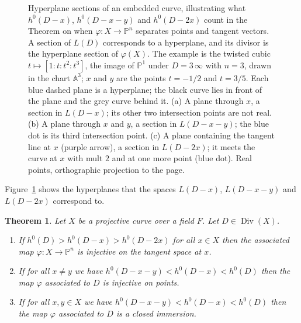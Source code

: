 \documentclass[12pt]{article}
\numberwithin{equation}{section}
\newtheorem{theorem}{Theorem}[subsection]
\theoremstyle{definition}
\theoremstyle{remark}
\newcommand{\PP}{\mathbb{P}}
\renewcommand{\AA}{\mathbb{A}}
\newcommand{\Div}{\operatorname{Div}}
\begin{document}
\begin{figure}[H]
\centering

\caption{Hyperplane sections of an embedded curve, illustrating what $h^0(D-x)$, $h^0(D-x-y)$ and $h^0(D-2x)$ count in the Theorem on when $\varphi\colon X\to\PP^n$ separates points and tangent vectors. A section of $L(D)$ corresponds to a hyperplane, and its divisor is the hyperplane section of $\varphi(X)$. The example is the twisted cubic $t\mapsto[1{:}t{:}t^2{:}t^3]$, the image of $\PP^1$ under $D=3\,\infty$ with $n=3$, drawn in the chart $\AA^3$; $x$ and $y$ are the points $t=-1/2$ and $t=3/5$. Each blue dashed plane is a hyperplane; the black curve lies in front of the plane and the grey curve behind it. (a) A plane through $x$, a section in $L(D-x)$; its other two intersection points are not real. (b) A plane through $x$ and $y$, a section in $L(D-x-y)$; the blue dot is its third intersection point. (c) A plane containing the tangent line at $x$ (purple arrow), a section in $L(D-2x)$; it meets the curve at $x$ with mult $2$ and at one more point (blue dot). Real points, orthographic projection to the page.}\label{fig:hyperplanes-through-points}
\end{figure}
Figure~\ref{fig:hyperplanes-through-points} shows the hyperplanes that the spaces $L(D-x)$, $L(D-x-y)$ and $L(D-2x)$ correspond to.

\begin{theorem}
	Let $X$ be a projective curve over a field $F$. 
	Let $D\in \Div(X)$.
	\begin{enumerate}
		\item 	If $h^0(D)>h^0(D-x)>h^0(D-2x)$ for all $x\in X$ then the associated map $\varphi:X \to \PP^n$ is injective on the tangent space at $x$.
		\item If for all $x\neq y$ we have $h^0(D-x-y)<h^0(D-x)<h^0(D)$ then the map $\varphi$ associated to $D$ is injective on points.
		\item If for all $x,y\in X$ we have $h^0(D-x-y)<h^0(D-x)<h^0(D)$ then the map $\varphi$ associated to $D$ is a closed immersion.
	\end{enumerate}
\end{theorem}
\end{document}

